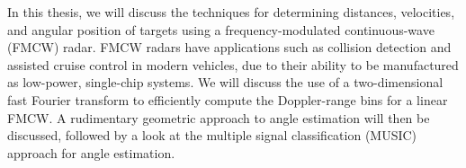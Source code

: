 In this thesis, we will discuss the
techniques for determining distances, velocities, and angular position of targets
using a frequency-modulated continuous-wave (FMCW) radar. FMCW radars have
applications such as collision detection and assisted
cruise control in modern vehicles, due to their ability to be manufactured as
low-power, single-chip systems. We will discuss the use of a two-dimensional
fast Fourier transform to efficiently compute the Doppler-range bins for a
linear FMCW. A rudimentary geometric approach to angle estimation will then be
discussed, followed by a look at the multiple signal classification (MUSIC)
approach for angle estimation.
